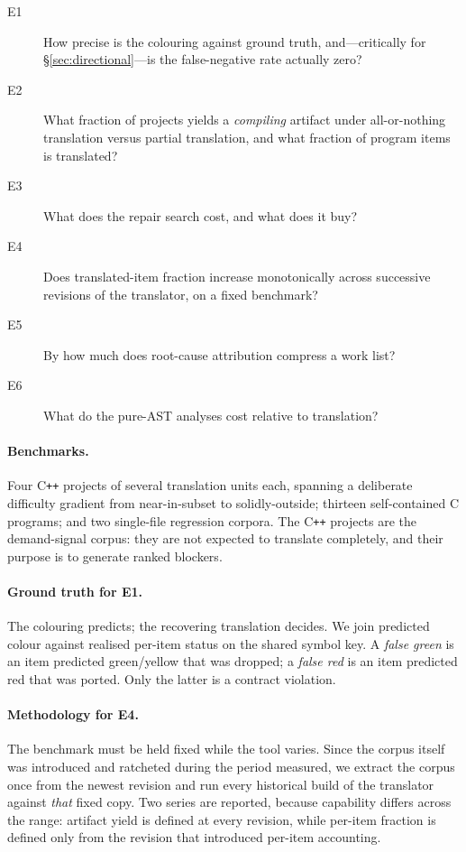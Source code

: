 \documentclass[10pt,twocolumn]{article}
\begin{document}
\begin{description}
\item[E1] How precise is the colouring against ground truth, and---critically
for \S\ref{sec:directional}---is the false-negative rate actually zero?
\item[E2] What fraction of projects yields a \emph{compiling} artifact under
all-or-nothing translation versus partial translation, and what fraction of
program items is translated?
\item[E3] What does the repair search cost, and what does it buy?
\item[E4] Does translated-item fraction increase monotonically across
successive revisions of the translator, on a fixed benchmark?
\item[E5] By how much does root-cause attribution compress a work list?
\item[E6] What do the pure-AST analyses cost relative to translation?
\end{description}

\paragraph{Benchmarks.} Four C\texttt{++} projects of several translation units
each, spanning a deliberate difficulty gradient from near-in-subset to
solidly-outside; thirteen self-contained C programs; and two single-file
regression corpora. The C\texttt{++} projects are the demand-signal corpus: they
are not expected to translate completely, and their purpose is to generate
ranked blockers.

\paragraph{Ground truth for E1.} The colouring predicts; the recovering
translation decides. We join predicted colour against realised per-item status
on the shared symbol key. A \emph{false green} is an item predicted
green/yellow that was dropped; a \emph{false red} is an item predicted red
that was ported. Only the latter is a contract violation.

\paragraph{Methodology for E4.} The benchmark must be held fixed while the
tool varies. Since the corpus itself was introduced and ratcheted during the
period measured, we extract the corpus once from the newest revision and run
every historical build of the translator against \emph{that} fixed copy. Two
series are reported, because capability differs across the range: artifact
yield is defined at every revision, while per-item fraction is defined only
from the revision that introduced per-item accounting.
\end{document}
